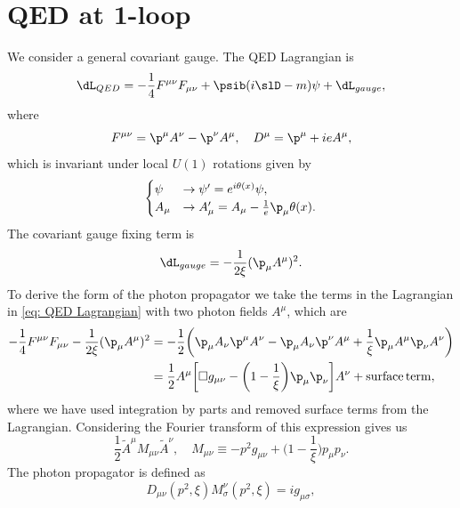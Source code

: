 \chapter{QED at 1-loop}
We consider a general covariant gauge. The QED Lagrangian is
\begin{equation}
\label{eq: QED Lagrangian}
    \dL_{QED} = -\frac{1}{4}F^{\mu\nu}F_{\mu\nu} + \psib(i\slD - m)\psi + \dL_{gauge},
\end{equation}
where 
\begin{equation}
    F^{\mu\nu} = \p^\mu A^\nu - \p^\nu A^\mu,\quad D^\mu = \p^\mu + ieA^\mu,
\end{equation}
which is invariant under local $U(1)$ rotations given by
\begin{equation}
    \begin{cases}
        \psi &\to \psi' = e^{i\theta(x)}\psi, \\
        A_\mu &\to A'_\mu = A_\mu - \frac{1}{e}\p_\mu\theta(x).
    \end{cases}
\end{equation}
The covariant gauge fixing term is 
\begin{equation}
    \dL_{gauge} = -\frac{1}{2\xi}(\p_\mu A^\mu)^2.
\end{equation}
To derive the form of the photon propagator we take the terms in the Lagrangian in \eqref{eq: QED Lagrangian} with two photon fields $A^\mu$, which are
\begin{equation}
    \begin{split}
        -\frac{1}{4}F^{\mu\nu}F_{\mu\nu} - \frac{1}{2\xi}(\p_\mu A^\mu)^2 &= -\frac{1}{2}\bigg(\p_\mu A_\nu \p^\mu A^\nu - \p_\mu A_\nu \p^\nu A^\mu + \frac{1}{\xi}\p_\mu A^\mu \p_\nu A^\nu\bigg) \\
        &=\frac{1}{2}A^\mu\bigg[\square g_{\mu\nu} - \bigg(1 - \frac{1}{\xi}\bigg)\p_\mu \p_\nu\bigg]A^\nu + \mathrm{surface\,term},
    \end{split}
\end{equation}
where we have used integration by parts and removed surface terms from the Lagrangian. Considering the Fourier transform of this expression gives us
\begin{equation}
    \frac{1}{2}\tilde{A}^\mu M_{\mu\nu}\tilde{A}^\nu,\quad M_{\mu\nu} \equiv -p^2g_{\mu\nu} + \bigg(1 - \frac{1}{\xi}\bigg)p_\mu p_\nu.
\end{equation}
The photon propagator is defined as
\begin{equation}
\label{eq: photon propagator}
    D_{\mu\nu}(p^2,\xi)M^\nu_\sigma(p^2,\xi) = ig_{\mu\sigma},
\end{equation}
